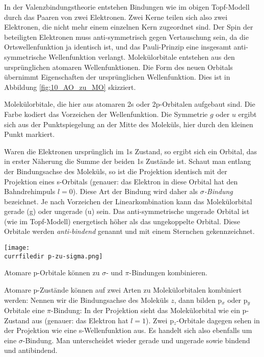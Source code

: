 In der Valenzbindungstheorie entstehen Bindungen wie im obigen Topf-Modell  durch das 
Paaren von zwei Elektronen. Zwei Kerne teilen sich also zwei Elektronen, die nicht mehr einem einzelnen Kern zugeordnet sind. Der Spin der beteiligten Elektronen muss anti-symmetrisch gegen Vertauschung sein, da die Ortswellenfunktion ja identisch ist, und das Pauli-Prinzip eine insgesamt anti-symmetrische Wellenfunktion  verlangt. Molekülorbitale entstehen aus den ursprünglichen atomaren Wellenfunktionen. Die Form des neuen Orbitals übernimmt Eigenschaften der ursprünglichen Wellenfunktion. Dies ist in Abbildung \ref{fig:10_AO_zu_MO} skizziert. 

\begin{marginfigure}
\caption{Molekülorbitale, die hier aus atomaren 2s oder 2p-Orbitalen aufgebaut sind. Die Farbe kodiert das Vorzeichen der Wellenfunktion. Die Symmetrie $g$ oder $u$ ergibt sich aus der Punktspiegelung an der Mitte des Moleküls, hier durch den kleinen Punkt markiert. \label{fig:10_AO_zu_MO}}
\end{marginfigure}




Waren die Elektronen ursprünglich im 1s Zustand, so ergibt sich ein Orbital, das in erster Näherung die Summe der beiden 1s Zustände ist. Schaut man entlang der Bindungsachse des Moleküls, so ist die Projektion identisch mit der Projektion eines  s-Orbitals (genauer: das Elektron in diese Orbital hat den Bahndrehimpuls $l=0$). Diese Art der Bindung wird daher als \emph{$\sigma$-Bindung} bezeichnet. Je nach Vorzeichen der Linearkombination kann das Molekülorbital gerade  (g) oder ungerade (u) sein. Das anti-symmetrische ungerade  Orbital ist (wie im Topf-Modell) energetisch höher als das ungekoppelte Orbital. Diese Orbitale werden \emph{anti-bindend} genannt und mit einem Sternchen gekennzeichnet.

%
\begin{marginfigure}
\texttt{[image: \\currfiledir p-zu-sigma.png]}
\caption{Atomare p-Orbitale können zu $\sigma$- und $\pi$-Bindungen kombinieren. }
\end{marginfigure}


Atomare p-Zustände können auf zwei Arten zu Molekülorbitalen kombiniert werden: Nennen wir die Bindungsachse des Moleküls $z$, dann bilden p$_x$ oder p$_y$ Orbitale eine $\pi$-Bindung: In der Projektion sieht das Molekülorbital wie ein p-Zustand aus (genauer: das Elektron hat $l=1$). Zwei p$_z$-Orbitale dagegen sehen in der Projektion wie eine s-Wellenfunktion aus. Es handelt sich also ebenfalls um eine $\sigma$-Bindung. Man unterscheidet wieder gerade und ungerade sowie bindend und antibindend.



